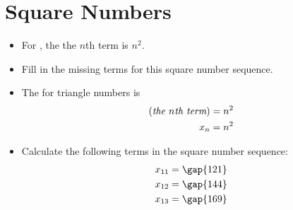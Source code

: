 \section{Square Numbers}

\begin{itemize}
    \item For ,
    the the $n$th term is $n^2$.

    \item Fill in the missing terms for this square number sequence.
    
    
    \item The  for triangle numbers is
    \begin{align}
        \left(\text{\itshape{the $n$th term}}\right) &= n^2 \\
        x_n                                           &= n^2 
    \end{align}
    
    \item Calculate the following terms in the square number sequence:
    \begin{align} 
        x_{11} &= \text{\gap{121}} \\
        x_{12} &= \text{\gap{144}} \\
        x_{13} &= \text{\gap{169}} 
    \end{align}
\end{itemize}
